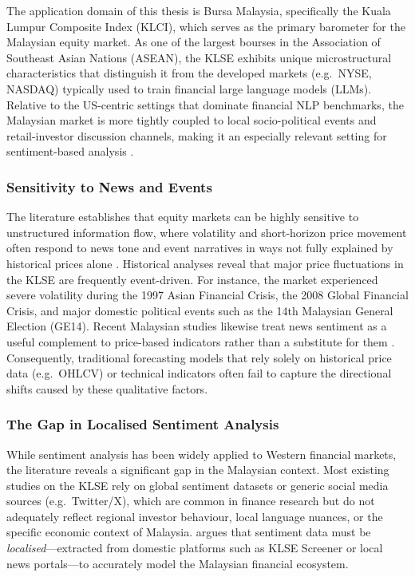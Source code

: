 \documentclass[12pt]{ucetd}
\begin{document}
The application domain of this thesis is Bursa Malaysia, specifically the Kuala Lumpur Composite Index (KLCI), which serves as the primary barometer for the Malaysian equity market. As one of the largest bourses in the Association of Southeast Asian Nations (ASEAN), the KLSE exhibits unique microstructural characteristics that distinguish it from the developed markets (e.g.\ NYSE, NASDAQ) typically used to train financial large language models (LLMs). Relative to the US-centric settings that dominate financial NLP benchmarks, the Malaysian market is more tightly coupled to local socio-political events and retail-investor discussion channels, making it an especially relevant setting for sentiment-based analysis \cite{baker2006investor, cheng2019malaysian, tan2025klse}.

\subsubsection{Sensitivity to News and Events}

The literature establishes that equity markets can be highly sensitive to unstructured information flow, where volatility and short-horizon price movement often respond to news tone and event narratives in ways not fully explained by historical prices alone \cite{tetlock2007giving, atkins2018financial}. Historical analyses reveal that major price fluctuations in the KLSE are frequently event-driven. For instance, the market experienced severe volatility during the 1997 Asian Financial Crisis, the 2008 Global Financial Crisis, and major domestic political events such as the 14th Malaysian General Election (GE14). Recent Malaysian studies likewise treat news sentiment as a useful complement to price-based indicators rather than a substitute for them \cite{cheng2019malaysian, tan2025klse}. Consequently, traditional forecasting models that rely solely on historical price data (e.g.\ OHLCV) or technical indicators often fail to capture the directional shifts caused by these qualitative factors.

\subsubsection{The Gap in Localised Sentiment Analysis}

While sentiment analysis has been widely applied to Western financial markets, the literature reveals a significant gap in the Malaysian context. Most existing studies on the KLSE rely on global sentiment datasets or generic social media sources (e.g.\ Twitter/X), which are common in finance research \cite{bollen2011twitter, chen2019information} but do not adequately reflect regional investor behaviour, local language nuances, or the specific economic context of Malaysia. \citet{tan2025klse} argues that sentiment data must be \emph{localised}---extracted from domestic platforms such as KLSE Screener or local news portals---to accurately model the Malaysian financial ecosystem.
\end{document}
